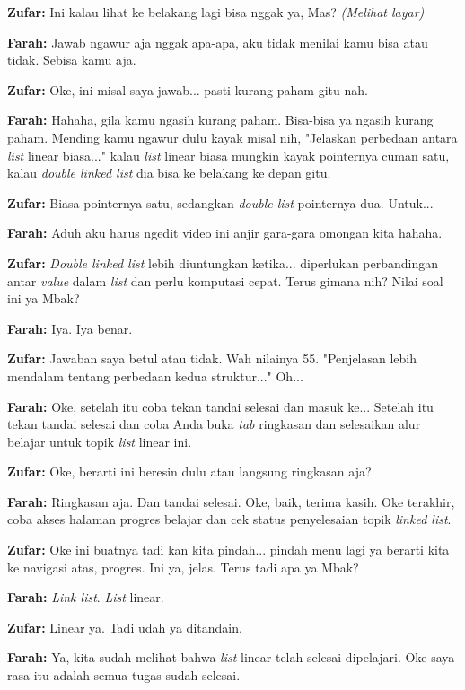 \textbf{Zufar:} Ini kalau lihat ke belakang lagi bisa nggak ya, Mas? \textit{(Melihat layar)}

\textbf{Farah:} Jawab ngawur aja nggak apa-apa, aku tidak menilai kamu bisa atau tidak. Sebisa kamu aja.

\textbf{Zufar:} Oke, ini misal saya jawab... pasti kurang paham gitu nah.

\textbf{Farah:} Hahaha, gila kamu ngasih kurang paham. Bisa-bisa ya ngasih kurang paham. Mending kamu ngawur dulu kayak misal nih, "Jelaskan perbedaan antara \textit{list} linear biasa..." kalau \textit{list} linear biasa mungkin kayak pointernya cuman satu, kalau \textit{double linked list} dia bisa ke belakang ke depan gitu.

\textbf{Zufar:} Biasa pointernya satu, sedangkan \textit{double list} pointernya dua. Untuk...

\textbf{Farah:} Aduh aku harus ngedit video ini anjir gara-gara omongan kita hahaha.

\textbf{Zufar:} \textit{Double linked list} lebih diuntungkan ketika... diperlukan perbandingan antar \textit{value} dalam \textit{list} dan perlu komputasi cepat. Terus gimana nih? Nilai soal ini ya Mbak?

\textbf{Farah:} Iya. Iya benar.

\textbf{Zufar:} Jawaban saya betul atau tidak. Wah nilainya 55. "Penjelasan lebih mendalam tentang perbedaan kedua struktur..." Oh...

\textbf{Farah:} Oke, setelah itu coba tekan tandai selesai dan masuk ke... Setelah itu tekan tandai selesai dan coba Anda buka \textit{tab} ringkasan dan selesaikan alur belajar untuk topik \textit{list} linear ini.

\textbf{Zufar:} Oke, berarti ini beresin dulu atau langsung ringkasan aja?

\textbf{Farah:} Ringkasan aja. Dan tandai selesai. Oke, baik, terima kasih. Oke terakhir, coba akses halaman progres belajar dan cek status penyelesaian topik \textit{linked list}.

\textbf{Zufar:} Oke ini buatnya tadi kan kita pindah... pindah menu lagi ya berarti kita ke navigasi atas, progres. Ini ya, jelas. Terus tadi apa ya Mbak?

\textbf{Farah:} \textit{Link list}. \textit{List} linear.

\textbf{Zufar:} Linear ya. Tadi udah ya ditandain.

\textbf{Farah:} Ya, kita sudah melihat bahwa \textit{list} linear telah selesai dipelajari. Oke saya rasa itu adalah semua tugas sudah selesai.

